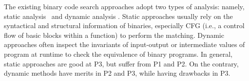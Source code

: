 The existing binary code search approaches adopt two types of analysis: namely, static analysis~\cite{DBLP:conf/pldi/DavidY14,saebjornsen2009detecting,luo2014semantics,DBLP:conf/sp/PewnyGGRH15} and dynamic analysis \cite{DBLP:conf/issta/JiangS09,DBLP:conf/asplos/Schkufza0A13,DBLP:conf/icse/JhiWJZLW11,egele2014blanket}.
Static approaches  usually  rely on the syntactical and structural information of binaries, especially CFG (i.e., a control flow of basic blocks within a function) to perform the matching. %
Dynamic approaches often inspect the invariants of input-output or intermediate values of program at runtime to check the equivalence of binary programs. In general, static approaches are good at P3, but suffer from P1 and P2. On the contrary, dynamic methods have merits in P2 and P3, while having drawbacks in P3.


